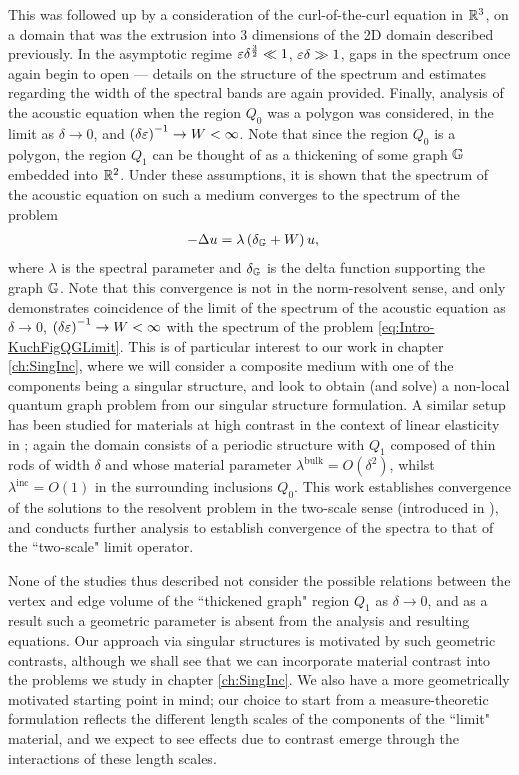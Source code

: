 This was followed up \cite{figotin1996band-maxwell} by a consideration of the curl-of-the-curl equation in $\mathbb{R}^3$, on a domain that was the extrusion into 3 dimensions of the 2D domain described previously.
In the asymptotic regime $\varepsilon\delta^{\frac{3}{2}}\ll 1$, $\varepsilon\delta\gg1$, gaps in the spectrum once again begin to open --- details on the structure of the spectrum and estimates regarding the width of the spectral bands are again provided.
Finally, analysis of the acoustic equation when the region $Q_0$ was a polygon \cite{figotin1998spectral} was considered, in the limit as $\delta\rightarrow0$, and $\left( \delta\varepsilon \right)^{-1}\rightarrow W<\infty$.
Note that since the region $Q_0$ is a polygon, the region $Q_1$ can be thought of as a thickening of some graph $\mathbb{G}$ embedded into $\mathbb{R}^2$.
Under these assumptions, it is shown that the spectrum of the acoustic equation on such a medium converges to the spectrum of the problem
\begin{align} \label{eq:Intro-KuchFigQGLimit}
	-\Delta u &= \lambda\left( \delta_{\mathbb{G}} + W \right)u,
\end{align}
where $\lambda$ is the spectral parameter and $\delta_{\mathbb{G}}$ is the delta function supporting the graph $\mathbb{G}$.
Note that this convergence is not in the norm-resolvent sense, and only demonstrates coincidence of the limit of the spectrum of the acoustic equation as $\delta\rightarrow0$, $\left( \delta\varepsilon \right)^{-1}\rightarrow W<\infty$ with the spectrum of the problem \eqref{eq:Intro-KuchFigQGLimit}.
This is of particular interest to our work in chapter \ref{ch:SingInc}, where we will consider a composite medium with one of the components being a singular structure, and look to obtain (and solve) a non-local quantum graph problem from our singular structure formulation.
A similar setup has been studied for materials at high contrast in the context of linear elasticity in \cite{cherednichenko2019homogenisation}; again the domain consists of a periodic structure with $Q_1$ composed of thin rods of width $\delta$ and whose material parameter $\lambda^{\mathrm{bulk}}=O(\delta^2)$, whilst $\lambda^{\mathrm{inc}}=O(1)$ in the surrounding inclusions $Q_0$.
This work establishes convergence of the solutions to the resolvent problem in the two-scale sense (introduced in \cite{zhikov2000extension}), and conducts further analysis to establish convergence of the spectra to that of the ``two-scale" limit operator.

None of the studies thus described not consider the possible relations between the vertex and edge volume of the ``thickened graph" region $Q_1$ as $\delta\rightarrow0$, and as a result such a geometric parameter is absent from the analysis and resulting equations.
Our approach via singular structures is motivated by such geometric contrasts, although we shall see that we can incorporate material contrast into the problems we study in chapter \ref{ch:SingInc}.
We also have a more geometrically motivated starting point in mind; our choice to start from a measure-theoretic formulation reflects the different length scales of the components of the ``limit" material, and we expect to see effects due to contrast emerge through the interactions of these length scales.